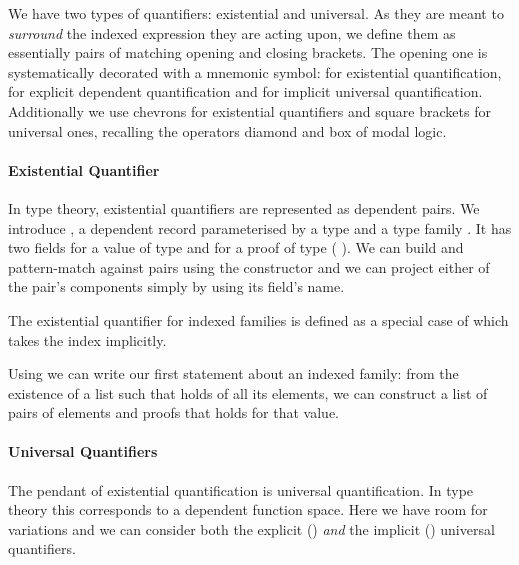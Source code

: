 We have two types of quantifiers: existential and universal. As they are
meant to \emph{surround} the indexed expression they are acting upon, we
define them as essentially pairs of matching opening and closing brackets.
The opening one is systematically decorated with a mnemonic symbol: 
for existential quantification,  for explicit dependent quantification
and  for implicit universal quantification. Additionally we use chevrons
for existential quantifiers and square brackets for universal ones, recalling
the operators diamond and box of modal logic.

\paragraph{Existential Quantifier}\label{def:sigma} In type theory, existential
quantifiers are represented as dependent pairs. We introduce , a dependent
record parameterised by a type  and a type family . It has two fields
 for a value of type  and  for a proof of type
{( )}. We can build and pattern-match against pairs using the
constructor \AIC{\_,\_} and we can project either of the pair's components simply
by using its field's name.


The existential quantifier for indexed families is defined as a special
case of  which takes the index  implicitly.


Using  we can write our first statement about an indexed family:
from the existence of a list such that  holds of all its elements,
we can construct a list of pairs of elements and proofs that  holds
for that value.


\paragraph{Universal Quantifiers} The pendant of existential quantification
is universal quantification. In type theory this corresponds to a dependent
function space. Here we have room for variations and we can consider both
the explicit () \emph{and} the implicit () universal
quantifiers.


